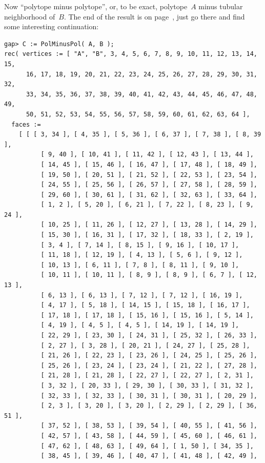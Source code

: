 \documentclass{article}
\begin{document}
Now ``polytope minus polytope'', or, to be exact, polytope~$A$ minus tubular neighborhood of~$B$. The end of the result is on page~\pageref{endS6minusS4}, just go there and find some interesting continuation:
\begin{verbatim}
gap> C := PolMinusPol( A, B );
rec( vertices := [ "A", "B", 3, 4, 5, 6, 7, 8, 9, 10, 11, 12, 13, 14, 15, 
      16, 17, 18, 19, 20, 21, 22, 23, 24, 25, 26, 27, 28, 29, 30, 31, 32, 
      33, 34, 35, 36, 37, 38, 39, 40, 41, 42, 43, 44, 45, 46, 47, 48, 49, 
      50, 51, 52, 53, 54, 55, 56, 57, 58, 59, 60, 61, 62, 63, 64 ], 
  faces := 
    [ [ [ 3, 34 ], [ 4, 35 ], [ 5, 36 ], [ 6, 37 ], [ 7, 38 ], [ 8, 39 ], 
          [ 9, 40 ], [ 10, 41 ], [ 11, 42 ], [ 12, 43 ], [ 13, 44 ], 
          [ 14, 45 ], [ 15, 46 ], [ 16, 47 ], [ 17, 48 ], [ 18, 49 ], 
          [ 19, 50 ], [ 20, 51 ], [ 21, 52 ], [ 22, 53 ], [ 23, 54 ], 
          [ 24, 55 ], [ 25, 56 ], [ 26, 57 ], [ 27, 58 ], [ 28, 59 ], 
          [ 29, 60 ], [ 30, 61 ], [ 31, 62 ], [ 32, 63 ], [ 33, 64 ], 
          [ 1, 2 ], [ 5, 20 ], [ 6, 21 ], [ 7, 22 ], [ 8, 23 ], [ 9, 24 ], 
          [ 10, 25 ], [ 11, 26 ], [ 12, 27 ], [ 13, 28 ], [ 14, 29 ], 
          [ 15, 30 ], [ 16, 31 ], [ 17, 32 ], [ 18, 33 ], [ 2, 19 ], 
          [ 3, 4 ], [ 7, 14 ], [ 8, 15 ], [ 9, 16 ], [ 10, 17 ], 
          [ 11, 18 ], [ 12, 19 ], [ 4, 13 ], [ 5, 6 ], [ 9, 12 ], 
          [ 10, 13 ], [ 6, 11 ], [ 7, 8 ], [ 8, 11 ], [ 9, 10 ], 
          [ 10, 11 ], [ 10, 11 ], [ 8, 9 ], [ 8, 9 ], [ 6, 7 ], [ 12, 13 ], 
          [ 6, 13 ], [ 6, 13 ], [ 7, 12 ], [ 7, 12 ], [ 16, 19 ], 
          [ 4, 17 ], [ 5, 18 ], [ 14, 15 ], [ 15, 18 ], [ 16, 17 ], 
          [ 17, 18 ], [ 17, 18 ], [ 15, 16 ], [ 15, 16 ], [ 5, 14 ], 
          [ 4, 19 ], [ 4, 5 ], [ 4, 5 ], [ 14, 19 ], [ 14, 19 ], 
          [ 22, 29 ], [ 23, 30 ], [ 24, 31 ], [ 25, 32 ], [ 26, 33 ], 
          [ 2, 27 ], [ 3, 28 ], [ 20, 21 ], [ 24, 27 ], [ 25, 28 ], 
          [ 21, 26 ], [ 22, 23 ], [ 23, 26 ], [ 24, 25 ], [ 25, 26 ], 
          [ 25, 26 ], [ 23, 24 ], [ 23, 24 ], [ 21, 22 ], [ 27, 28 ], 
          [ 21, 28 ], [ 21, 28 ], [ 22, 27 ], [ 22, 27 ], [ 2, 31 ], 
          [ 3, 32 ], [ 20, 33 ], [ 29, 30 ], [ 30, 33 ], [ 31, 32 ], 
          [ 32, 33 ], [ 32, 33 ], [ 30, 31 ], [ 30, 31 ], [ 20, 29 ], 
          [ 2, 3 ], [ 3, 20 ], [ 3, 20 ], [ 2, 29 ], [ 2, 29 ], [ 36, 51 ], 
          [ 37, 52 ], [ 38, 53 ], [ 39, 54 ], [ 40, 55 ], [ 41, 56 ], 
          [ 42, 57 ], [ 43, 58 ], [ 44, 59 ], [ 45, 60 ], [ 46, 61 ], 
          [ 47, 62 ], [ 48, 63 ], [ 49, 64 ], [ 1, 50 ], [ 34, 35 ], 
          [ 38, 45 ], [ 39, 46 ], [ 40, 47 ], [ 41, 48 ], [ 42, 49 ], 

\end{verbatim}
\end{document}
